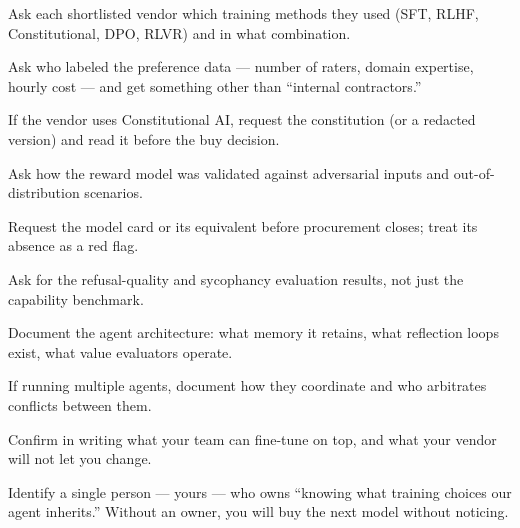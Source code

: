 \begin{TNchecklist}
\item Ask each shortlisted vendor which training methods they used (SFT, RLHF, Constitutional, DPO, RLVR) and in what combination.
\item Ask who labeled the preference data --- number of raters, domain expertise, hourly cost --- and get something other than ``internal contractors.''
\item If the vendor uses Constitutional AI, request the constitution (or a redacted version) and read it before the buy decision.
\item Ask how the reward model was validated against adversarial inputs and out-of-distribution scenarios.
\item Request the model card or its equivalent before procurement closes; treat its absence as a red flag.
\item Ask for the refusal-quality and sycophancy evaluation results, not just the capability benchmark.
\item Document the agent architecture: what memory it retains, what reflection loops exist, what value evaluators operate.
\item If running multiple agents, document how they coordinate and who arbitrates conflicts between them.
\item Confirm in writing what your team can fine-tune on top, and what your vendor will not let you change.
\item Identify a single person --- yours --- who owns ``knowing what training choices our agent inherits.'' Without an owner, you will buy the next model without noticing.
\end{TNchecklist}
